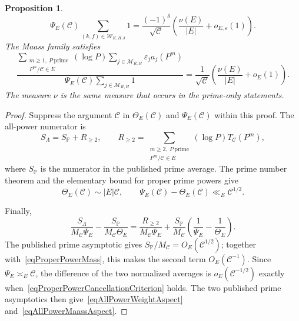 \documentclass[12pt,reqno]{amsart}
\numberwithin{equation}{section}
\theoremstyle{plain}
\newtheorem{proposition}[theorem]{Proposition}
\theoremstyle{definition}
\theoremstyle{remark}
\begin{document}
\begin{proposition}
\begin{equation}
{}{
\displaystyle\Psi_E(\mathcal C)
\sum_{(k,f)\in\mathscr W_{K,H,\delta}}1
}
=\frac{(-1)^\delta}{\sqrt{\mathcal C}}
\left(\frac{\nu(E)}{|E|}+o_{E,\varepsilon}(1)\right).
\end{equation}
The Maass family satisfies
\begin{equation}
\label{eqAllPowerMaassAspect}
\frac{
\displaystyle\sum_{\substack{m\geq1,\ P\ \mathrm{prime}\\P^m/\mathcal C\in E}}
(\log P)\sum_{j\in\mathscr M_{R,H}}\varepsilon_j a_j(P^m)
}{
\displaystyle\Psi_E(\mathcal C)
\sum_{j\in\mathscr M_{R,H}}1
}
=\frac{1}{\sqrt{\mathcal C}}
\left(\frac{\nu(E)}{|E|}+o_{E}(1)\right).
\end{equation}
The measure $\nu$ is the same measure that occurs in the prime-only statements.
\end{proposition}

\begin{proof}
Suppress the argument $\mathcal C$ in $\Theta_E(\mathcal C)$ and $\Psi_E(\mathcal C)$ within this proof.
The all-power numerator is
\begin{equation*}
S_{\Lambda}
=S_{\mathbb P}+R_{\geq2},
\qquad
R_{\geq2}
=\sum_{\substack{m\geq2,\ P\ \mathrm{prime}\\P^m/\mathcal C\in E}}
(\log P)T_{\mathcal C}(P^m),
\end{equation*}
where $S_{\mathbb P}$ is the numerator in the published prime average.
The prime number theorem and the elementary bound for proper prime powers give
\begin{equation}
\label{eqProperPowerMass}
\Theta_E(\mathcal C)\sim |E|\mathcal C,
\qquad
\Psi_E(\mathcal C)-\Theta_E(\mathcal C)
\ll_E\mathcal C^{1/2}.
\end{equation}

Finally,
\begin{equation*}
\frac{S_{\Lambda}}{M_{\mathcal C}\Psi_E}
-\frac{S_{\mathbb P}}{M_{\mathcal C}\Theta_E}
=\frac{R_{\geq2}}{M_{\mathcal C}\Psi_E}
+\frac{S_{\mathbb P}}{M_{\mathcal C}}
\left(\frac1{\Psi_E}-\frac1{\Theta_E}\right).
\end{equation*}
The published prime asymptotic gives $S_{\mathbb P}/M_{\mathcal C}=O_E(\mathcal C^{1/2})$; together with~\eqref{eqProperPowerMass}, this makes the second term $O_E(\mathcal C^{-1})$.
Since $\Psi_E\asymp_E\mathcal C$, the difference of the two normalized averages is $o_E(\mathcal C^{-1/2})$ exactly when~\eqref{eqProperPowerCancellationCriterion} holds.
The two published prime asymptotics then give~\eqref{eqAllPowerWeightAspect} and~\eqref{eqAllPowerMaassAspect}.
\end{proof}
\end{document}
